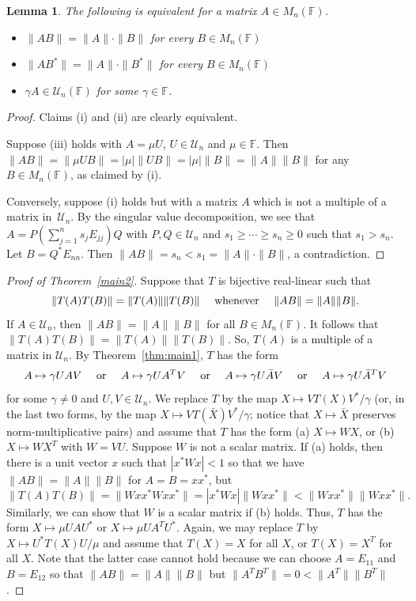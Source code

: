 \documentclass[11pt]{article}
\newtheorem{lemma}[theorem]{Lemma}
\numberwithin{equation}{section}
\def\IF{{\mathbb F}}
\begin{document}
 \begin{lemma}\label{lam1} The following is equivalent for a matrix $A\in M_n(\IF)$.
 \begin{itemize}
  \item[{\rm (i)}] $\|AB\|=\|A\|\cdot\|B\|$ for every $B\in M_n(\IF)$
   \item[{\rm (ii)}] $\|AB^\ast\|=\|A\|\cdot\|B^\ast\|$ for every $B\in M_n(\IF)$
   \item[{\rm (iii)}] $\gamma A\in {\mathcal U}_n(\IF)$ for some $\gamma \in \IF$.
 \end{itemize}
 \end{lemma}
\begin{proof}
Claims (i) and (ii)  are clearly equivalent.

Suppose   (iii) holds with $A = \mu U$,   $U \in {\mathcal U}_n$ and $\mu\in\IF$. Then $\|AB\| = \|\mu UB\| = |\mu| \|UB\| = |\mu| \|B\| = \|A\| \|B\|$
 for any $B \in M_n(\IF)$, as claimed by (i).

 Conversely, suppose (i) holds but with a matrix $A$ which is  not a multiple of a matrix in~${\mathcal U}_n$.
 By the singular value decomposition, we see that $A = P (\sum_{j=1}^n s_j E_{jj} )Q$ with $P, Q \in {\mathcal U}_n$
 and $s_1 \ge \cdots \ge s_n \ge0$ such that $s_1 > s_n$. Let
 $B = Q^*E_{nn}$. Then $\|AB\| = s_n < s_1 =  \|A\|\cdot \|B\|$, a contradiction.
\end{proof}


\begin{proof}[Proof of Theorem~\ref{main2}]

 Suppose that $T$ is bijective real-linear such that
$$\|T(A)T(B)\| = \|T(A)\| \|T(B)\| \quad \hbox{ whenever } \quad \|AB\| = \|A\| \|B\|.$$
If $A \in {\mathcal U}_n$, then $\|AB\| = \|A\| \|B\|$ for all $B \in M_n(\IF)$. It follows that
 $\|T(A)T(B)\| = \|T(A)\| \|T(B)\|$. So, $T(A)$ is a multiple of a matrix in ${\mathcal U}_n$. By
 Theorem~\ref{thm:main1}, $T$ has the form
 $$A \mapsto  \gamma UAV \quad \hbox{ or } \quad A \mapsto  \gamma UA^TV \quad \hbox{ or } \quad A \mapsto  \gamma U\bar{A}V \quad \hbox{ or } \quad A \mapsto  \gamma U\bar{A}^TV$$
 for some   $\gamma \ne 0$ and $U, V \in {\mathcal U}_n$. We replace $T$ by the map
 $X \mapsto VT(X)V^*/\gamma$ (or, in the last two forms, by the map $X \mapsto VT(\bar{X})V^*/\gamma$; notice that $X\mapsto\bar{X}$ preserves norm-multiplicative pairs) and assume that $T$ has the form (a) $X \mapsto WX$, or (b) $X \mapsto WX^T$ with $W = VU$.
 Suppose $W$ is not a scalar matrix. If (a) holds, then there is a unit vector $x$ such that $|x^\ast Wx|<1$
 so that  we have $\|AB\| = \|A\| \|B\|$
 for $A=B=xx^\ast$, but
 $$\|T(A)T(B)\| = \|Wxx^*W xx^*\| = |x^*Wx| \|Wxx^*\| < \|Wxx^*\| \|W xx^*\|.$$
 Similarly, we can show that $W$ is a scalar matrix if (b) holds.  Thus, $T$ has the form $X \mapsto \mu UAU^*$
 or $X \mapsto \mu UA^T U^*$. Again, we may replace $T$ by $X \mapsto U^*T(X)U/\mu$ and assume that
 $T(X) = X$ for all $X$, or $T(X) = X^T$ for all $X$. Note that the latter case
 cannot hold because we can choose $A = E_{11}$ and $B = E_{12}$ so that $\|AB\| = \|A\| \|B\|$
 but $\|A^TB^T\| = 0  <  \|A^T\| \|B^T\|$.
\end{proof}
\end{document}
